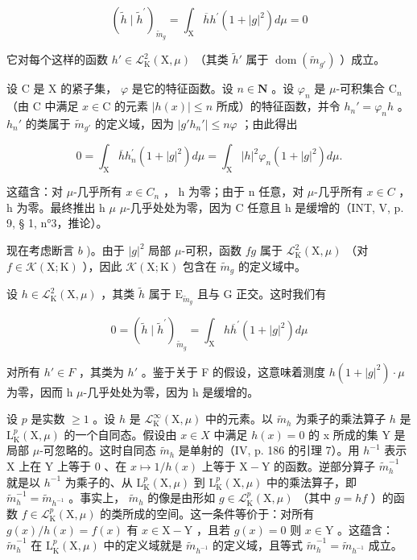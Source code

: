 \[
(\widetilde {h} \mid \widetilde {h} ^ {\prime}) _ {\widetilde {m} _ {g}} = \int_ {\mathrm{X}} \overline {{h}} h ^ {\prime} (1 + | g | ^ {2}) d \mu = 0
\]

它对每个这样的函数 \(h' \in \mathcal{L}_{\mathrm{K}}^{2}(\mathrm{X}, \mu)\) （其类 \(\widetilde{h}'\) 属于 \(\operatorname{dom}(\widetilde{m}_{g'})\) ）成立。

设 C 是 X 的紧子集， \(\varphi\) 是它的特征函数。设 \(n \in \mathbf{N}\) 。设 \(\varphi_n\) 是 \(\mu\)-可积集合 \(\mathrm{C}_n\) （由 C 中满足 \(x \in \mathrm{C}\) 的元素 \(|h(x)| \leqslant n\) 所成）的特征函数，并令 \(h_n' = \varphi_n h\) 。 \(h_n'\) 的类属于 \(\tilde{m}_{g'}\) 的定义域，因为 \(|g'h_n'| \leqslant n\varphi\) ；由此得出

\[
0 = \int_ {\mathrm{X}} \overline {{h}} h _ {n} ^ {\prime} (1 + | g | ^ {2}) d \mu = \int_ {\mathrm{X}} | h | ^ {2} \varphi_ {n} (1 + | g | ^ {2}) d \mu .
\]

这蕴含：对 \(\mu\)-几乎所有 \(x \in C_{n}\) ， h 为零；由于 n 任意，对 \(\mu\)-几乎所有 \(x \in C\) ， h 为零。最终推出 h \(\mu\) \(\mu\)-几乎处处为零，因为 C 任意且 h 是缓增的（INT, V, p. 9, § 1, n°3，推论）。

现在考虑断言 \(b\) )。由于 \(|g|^2\) 局部 \(\mu\)-可积，函数 \(fg\) 属于 \(\mathcal{L}_{\mathrm{K}}^{2}(\mathrm{X},\mu)\) （对 \(f\in\mathcal{K}(\mathrm{X};\mathrm{K})\) ），因此 \(\mathcal{K}(\mathrm{X};\mathrm{K})\) 包含在 \(\widetilde{m}_{g}\) 的定义域中。

设 \(h \in \mathcal{L}_{\mathrm{K}}^{2}(\mathrm{X}, \mu)\) ，其类 \(\widetilde{h}\) 属于 \(\mathrm{E}_{\widetilde{m}_{g}}\) 且与 G 正交。这时我们有

\[
0 = (\widetilde {h} \mid \widetilde {h} ^ {\prime}) _ {\widetilde {m} _ {g}} = \int_ {\mathrm{X}} h \overline {{h}} ^ {\prime} (1 + | g | ^ {2}) d \mu
\]

对所有 \(h' \in F\) ，其类为 \(h'\) 。鉴于关于 F 的假设，这意味着测度 \(h(1 + |g|^{2}) \cdot \mu\) 为零，因而 h \(\mu\)-几乎处处为零，因为 h 是缓增的。

设 \(p\) 是实数 \(\geqslant 1\) 。设 \(h\) 是 \(\mathcal{L}_{\mathrm{K}}^{\infty}(\mathrm{X},\mu)\) 中的元素。以 \(\widetilde{m}_h\) 为乘子的乘法算子 \(h\) 是 \(\mathrm{L}_{\mathrm{K}}^{p}(\mathrm{X},\mu)\) 的一个自同态。假设由 \(x\in X\) 中满足 \(h(x)=0\) 的 x 所成的集 Y 是局部 \(\mu\)-可忽略的。这时自同态 \(\widetilde{m}_h\) 是单射的（IV, p. 186 的引理 7）。用 \(h^{-1}\) 表示 X 上在 Y 上等于 0 、在 \(x \mapsto 1/h(x)\) 上等于 \(\mathrm{X} - \mathrm{Y}\) 的函数。逆部分算子 \(\widetilde{m}_{h}^{-1}\) 就是以 \(h^{-1}\) 为乘子的、从 \(\mathrm{L}_{\mathrm{K}}^{p}(\mathrm{X},\mu)\) 到 \(\mathrm{L}_{\mathrm{K}}^{p}(\mathrm{X},\mu)\) 中的乘法算子，即 \(\widetilde{m}_{h}^{-1} = \widetilde{m}_{h^{-1}}\) 。事实上， \(\widetilde{m}_{h}\) 的像是由形如 \(g \in \mathcal{L}_{\mathrm{K}}^{p}(\mathrm{X},\mu)\) （其中 \(g = hf\) ）的函数 \(f \in \mathcal{L}_{\mathrm{K}}^{p}(\mathrm{X},\mu)\) 的类所成的空间。这一条件等价于：对所有 \(g(x)/h(x) = f(x)\) 有 \(x \in \mathrm{X} - \mathrm{Y}\) ，且若 \(g(x) = 0\) 则 \(x \in \mathrm{Y}\) 。这蕴含： \(\widetilde{m}_{h}^{-1}\) 在 \(\mathrm{L}_{\mathrm{K}}^{p}(\mathrm{X},\mu)\) 中的定义域就是 \(\widetilde{m}_{h^{-1}}\) 的定义域，且等式 \(\widetilde{m}_{h}^{-1} = \widetilde{m}_{h^{-1}}\) 成立。

